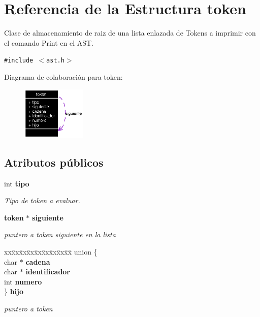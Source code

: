 \section{Referencia de la Estructura token}
\label{structtoken}
Clase de almacenamiento de raiz de una lista enlazada de Tokens a imprimir con el comando Print en el AST.  


{\tt \#include $<$ast.h$>$}

Diagrama de colaboraci\'{o}n para token:\begin{figure}[H]
\begin{center}
\leavevmode
\includegraphics[width=86pt]{structtoken__coll__graph}
\end{center}
\end{figure}
\subsection*{Atributos p\'{u}blicos}
\begin{CompactItemize}
\item 
int {\bf tipo}
\begin{CompactList}\small\item\em Tipo de token a evaluar. \item\end{CompactList}\item 
{\bf token} $\ast$ {\bf siguiente}
\begin{CompactList}\small\item\em puntero a token siguiente en la lista \item\end{CompactList}\item 
\begin{tabbing}
xx\=xx\=xx\=xx\=xx\=xx\=xx\=xx\=xx\=\kill
union \{\\
\>char $\ast$ {\bf cadena}\\
\>char $\ast$ {\bf identificador}\\
\>int {\bf numero}\\
\} {\bf hijo}\\

\end{tabbing}\begin{CompactList}\small\item\em puntero a token \item\end{CompactList}\end{CompactItemize}


